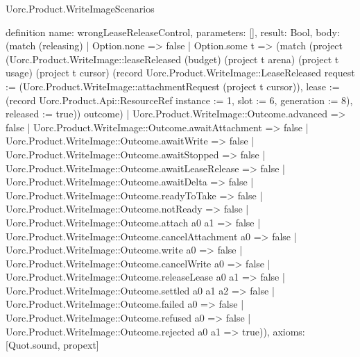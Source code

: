 \begin{lexlean}{Uorc.Product.WriteImageScenarios}
\begin{semanticmodule}
definition{
  name: wrongLeaseReleaseControl,
  parameters: [],
  result: Bool,
  body: (match (releasing)
    | Option.none => false
    | Option.some t => (match (project (Uorc.Product.WriteImage::leaseReleased (budget) (project t arena) (project t usage) (project t cursor) (record Uorc.Product.WriteImage::LeaseReleased {request := (Uorc.Product.WriteImage::attachmentRequest (project t cursor)), lease := (record Uorc.Product.Api::ResourceRef {instance := 1, slot := 6, generation := 8}), released := true})) outcome)
      | Uorc.Product.WriteImage::Outcome.advanced => false
      | Uorc.Product.WriteImage::Outcome.awaitAttachment => false
      | Uorc.Product.WriteImage::Outcome.awaitWrite => false
      | Uorc.Product.WriteImage::Outcome.awaitStopped => false
      | Uorc.Product.WriteImage::Outcome.awaitLeaseRelease => false
      | Uorc.Product.WriteImage::Outcome.awaitDelta => false
      | Uorc.Product.WriteImage::Outcome.readyToTake => false
      | Uorc.Product.WriteImage::Outcome.notReady => false
      | Uorc.Product.WriteImage::Outcome.attach a0 a1 => false
      | Uorc.Product.WriteImage::Outcome.cancelAttachment a0 => false
      | Uorc.Product.WriteImage::Outcome.write a0 => false
      | Uorc.Product.WriteImage::Outcome.cancelWrite a0 => false
      | Uorc.Product.WriteImage::Outcome.releaseLease a0 a1 => false
      | Uorc.Product.WriteImage::Outcome.settled a0 a1 a2 => false
      | Uorc.Product.WriteImage::Outcome.failed a0 => false
      | Uorc.Product.WriteImage::Outcome.refused a0 => false
      | Uorc.Product.WriteImage::Outcome.rejected a0 a1 => true)),
  axioms: [Quot.sound, propext]
}


\end{semanticmodule}
\end{lexlean}
